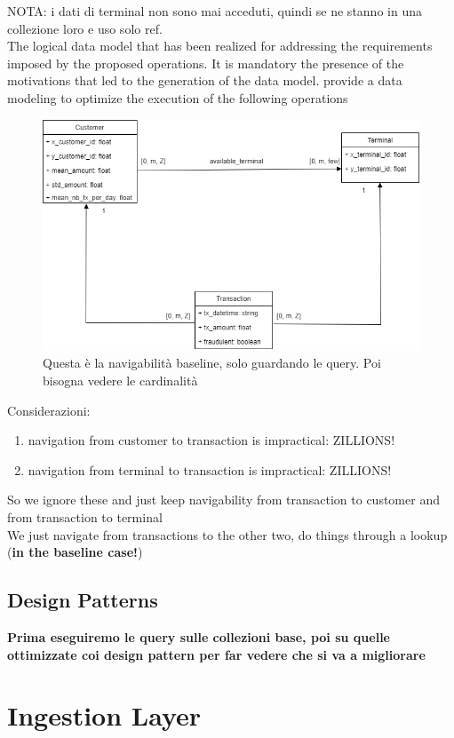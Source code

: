 \documentclass[runningheads]{llncs}
\begin{document}
NOTA: i dati di terminal non sono mai acceduti, quindi se ne stanno in una collezione loro e uso solo ref.
\\
The logical data model that has been realized for addressing the requirements imposed by the proposed operations. It is mandatory the presence of the motivations that led to the generation of the data model.
provide a data modeling to optimize the execution of the following operations
\begin{figure}[!htb] 
        \centering \includegraphics[width=0.9\columnwidth]{images/MongoBaselineNavigability.png}
        \caption{\label{fig3}Questa è la navigabilità baseline, solo guardando le query. Poi bisogna vedere le cardinalità}
\end{figure}
Considerazioni:
\begin{enumerate}
    \item navigation from customer to transaction is impractical: ZILLIONS!
    \item navigation from terminal to transaction is impractical: ZILLIONS!
\end{enumerate}
So we ignore these and just keep navigability from transaction to customer and from transaction to terminal\\
We just navigate from transactions to the other two, do things through a lookup (\textbf{in the baseline case!})
\subsection{Design Patterns}
\textbf{Prima eseguiremo le query sulle collezioni base, poi su quelle ottimizzate coi design pattern per far vedere che si va a migliorare}

\section{Ingestion Layer}
\end{document}
